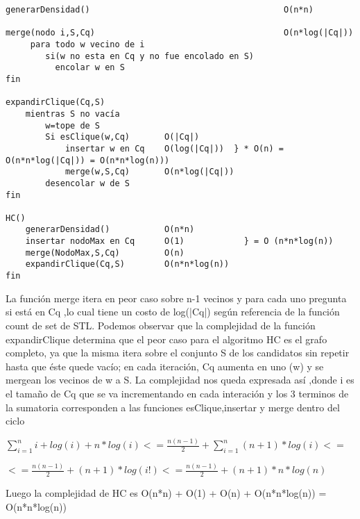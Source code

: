 \begin{verbatim}
generarDensidad()										O(n*n)
	
merge(nodo i,S,Cq)										O(n*log(|Cq|))	        
     para todo w vecino de i 
        si(w no esta en Cq y no fue encolado en S)
          encolar w en S
fin

expandirClique(Cq,S)								
    mientras S no vacía					 			
        w=tope de S									
        Si esClique(w,Cq)       O(|Cq|)				
            insertar w en Cq    O(log(|Cq|))  } * O(n) = O(n*n*log(|Cq|)) = O(n*n*log(n)))
            merge(w,S,Cq)       O(n*log(|Cq|))		
        desencolar w de S		              
fin												
									
HC()										 	
    generarDensidad()           O(n*n)		   	
    insertar nodoMax en Cq      O(1)            } = O (n*n*log(n)) 	
    merge(NodoMax,S,Cq)         O(n)			   
    expandirClique(Cq,S)        O(n*n*log(n))	 	
fin												

\end{verbatim}
La función merge itera en peor caso sobre n-1 vecinos y para cada uno pregunta si está en Cq ,lo cual tiene un costo de log(|Cq|) según referencia de la función count de set de STL. 
Podemos observar que la complejidad de la función expandirClique determina que el peor caso para el algoritmo HC es el grafo completo, ya que la misma itera sobre el conjunto S de los candidatos sin repetir hasta que éste quede vacío; en cada iteración, Cq aumenta en uno (w) y se mergean los vecinos de w a S.
La complejidad nos queda expresada así ,donde i es el tamaño de Cq que se va incrementando en cada interación y los 3 terminos de la sumatoria corresponden a las funciones esClique,insertar y merge dentro del ciclo

$\displaystyle \sum_{i=1}^{n} i + log(i) + n*log(i) <= \frac{n(n-1)}{2}+\sum_{i=1}^{n} (n+1)*log(i) <=$  
 
$\displaystyle  <= \frac{n(n-1)}{2}+(n+1)*log(i!) <= \frac{n(n-1)}{2}+(n+1)*n*log(n) $

Luego la complejidad de HC es O(n*n) + O(1) + O(n) + O(n*n*log(n)) = O(n*n*log(n))  

